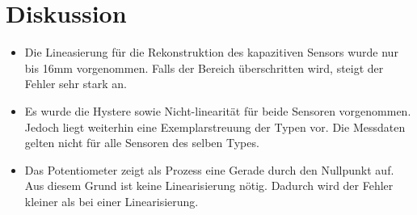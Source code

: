 \section{Diskussion}
\begin{itemize}
    \item Die Lineasierung für die Rekonstruktion des kapazitiven Sensors wurde nur bis 16mm vorgenommen. Falls der Bereich überschritten wird, steigt der Fehler sehr stark an.\\
    \item Es wurde die Hystere sowie Nicht-linearität für beide Sensoren vorgenommen. Jedoch liegt weiterhin eine Exemplarstreuung der Typen vor. Die Messdaten gelten nicht für alle Sensoren des selben Types.
    \item Das Potentiometer zeigt als Prozess eine Gerade durch den Nullpunkt auf. Aus diesem Grund ist keine Linearisierung nötig. Dadurch wird der Fehler kleiner als bei einer Linearisierung. 
\end{itemize}
      
\clearpage